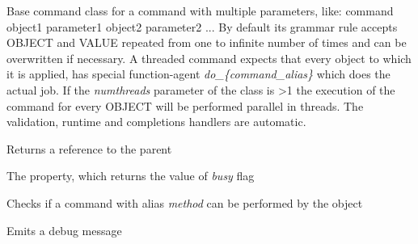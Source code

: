 \documentclass[letterpaper,10pt,english]{sphinxmanual}
\begin{document}
\begin{fulllineitems}
\label{command:pyfrid.core.command.BaseThreadedCommand}
Base  command class for a command with multiple parameters, like:
command object1 parameter1 object2 parameter2 ...
By default its grammar rule accepts OBJECT and VALUE repeated from one to infinite number of times and can be overwritten if necessary.
A threaded command expects that every object to which it is applied, has special function-agent \emph{do\_\{command\_alias\}} which does the actual job.
If the \emph{numthreads} parameter of the class is \textgreater{}1 the execution of the command for every OBJECT will be performed
parallel in threads. The validation, runtime and completions handlers are automatic.

\begin{fulllineitems}
\label{command:pyfrid.core.command.BaseThreadedCommand.app}
Returns a reference to the parent

\end{fulllineitems}


\begin{fulllineitems}
\label{command:pyfrid.core.command.BaseThreadedCommand.busy}
The property, which returns the value of \emph{busy} flag

\end{fulllineitems}


\begin{fulllineitems}
\label{command:pyfrid.core.command.BaseThreadedCommand.can}
Checks if a command with alias \emph{method} can be performed by the object

\end{fulllineitems}


\begin{fulllineitems}
\label{command:pyfrid.core.command.BaseThreadedCommand.debug}
Emits a debug message


\end{fulllineitems}
\end{fulllineitems}
\end{document}

